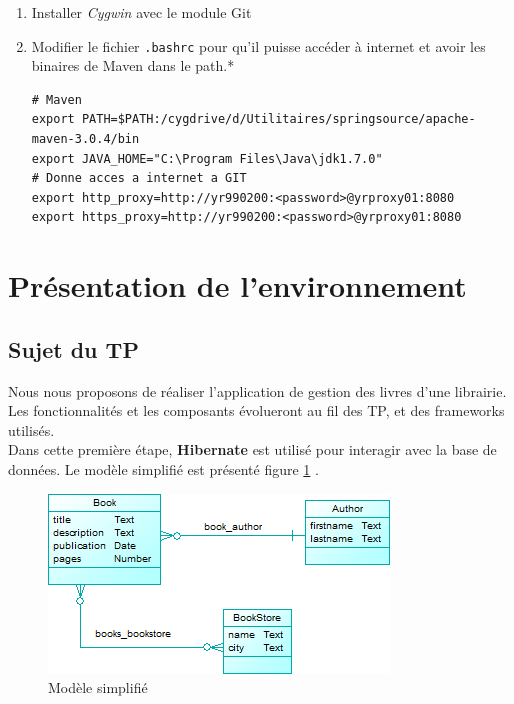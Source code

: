 \documentclass[small,algo]{dushClass} %
\begin{document}
\begin{enumerate}
\item Installer \emph{Cygwin} avec le module Git
\item Modifier le fichier \texttt{.bashrc} pour qu'il puisse accéder à internet et avoir les binaires de Maven dans le path.*
\lstset{language=BASH}
\begin{lstlisting}
# Maven
export PATH=$PATH:/cygdrive/d/Utilitaires/springsource/apache-maven-3.0.4/bin
export JAVA_HOME="C:\Program Files\Java\jdk1.7.0"
# Donne acces a internet a GIT
export http_proxy=http://yr990200:<password>@yrproxy01:8080
export https_proxy=http://yr990200:<password>@yrproxy01:8080
\end{lstlisting}
\end{enumerate}
\lstset{language=JAVA}



\section{Présentation de l'environnement}

\subsection{Sujet du TP}

Nous nous proposons de réaliser l'application de gestion des livres d'une librairie. Les fonctionnalités et les composants évolueront au fil des TP, et des frameworks utilisés.\\

Dans cette première étape, \textbf{Hibernate} est utilisé pour interagir avec la base de données. Le modèle simplifié est présenté figure \ref{model-base} .

\begin{figure}[ht]
	\center
	\includegraphics{images/simple_model.png}
	\caption{Modèle simplifié}\label{model-base}
\end{figure}
\end{document}
